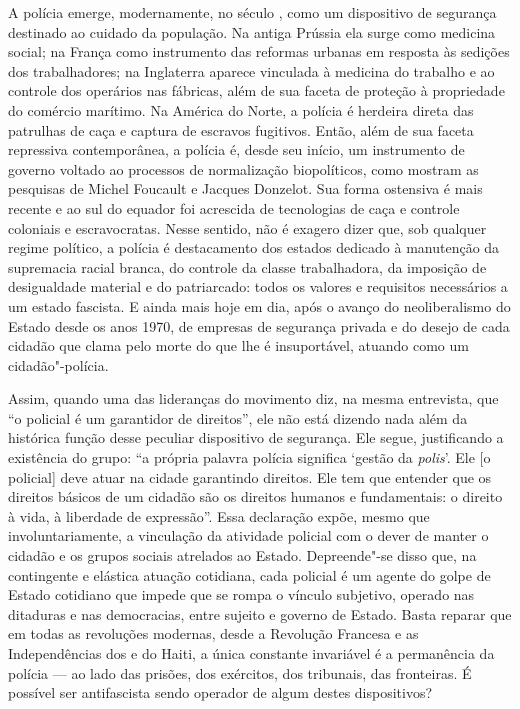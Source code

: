 A polícia emerge, modernamente, no século , como um dispositivo de segurança destinado ao cuidado da população. Na antiga Prússia ela surge como medicina social; na França como instrumento das reformas urbanas em resposta às sedições dos trabalhadores; na Inglaterra aparece vinculada à medicina do trabalho e ao controle dos operários nas fábricas, além de sua faceta de proteção à propriedade do comércio marítimo. Na América do Norte, a polícia é herdeira direta das patrulhas de caça e captura de escravos fugitivos. Então, além de sua faceta repressiva contemporânea, a polícia é, desde seu início, um instrumento de governo voltado ao processos de normalização biopolíticos, como mostram as pesquisas de Michel Foucault e Jacques Donzelot. Sua forma ostensiva é mais recente e ao sul do equador foi acrescida de tecnologias de caça e controle coloniais e escravocratas. Nesse sentido, não é exagero dizer que, sob qualquer regime político, a polícia é destacamento dos estados dedicado à manutenção da supremacia racial branca, do controle da classe trabalhadora, da imposição de desigualdade material e do patriarcado: todos os valores e requisitos necessários a um estado fascista. E ainda mais hoje em dia, após o avanço do neoliberalismo do Estado desde os anos 1970, de empresas de segurança privada e do desejo de cada cidadão que clama pelo morte do que lhe é insuportável, atuando como um cidadão"-polícia.

Assim, quando uma das lideranças do movimento diz, na mesma entrevista, que ``o policial é um garantidor de direitos'', ele não está dizendo nada além da histórica função desse peculiar dispositivo de segurança. Ele segue, justificando a existência do grupo: ``a própria palavra polícia significa `gestão da \emph{polis}'. Ele [o policial] deve atuar na cidade garantindo direitos. Ele tem que entender que os direitos básicos de um cidadão são os direitos humanos e fundamentais: o direito à vida, à liberdade de expressão''. Essa declaração expõe, mesmo que involuntariamente, a vinculação da atividade policial com o dever de manter o cidadão e os grupos sociais atrelados ao Estado. Depreende"-se disso que, na contingente e elástica atuação cotidiana, cada policial é um agente do golpe de Estado cotidiano que impede que se rompa o vínculo subjetivo, operado nas ditaduras e nas democracias, entre sujeito e governo de Estado. Basta reparar que em todas as revoluções modernas, desde a Revolução Francesa e as Independências dos  e do Haiti, a única constante invariável é a permanência da polícia --- ao lado das prisões, dos exércitos, dos tribunais, das fronteiras. É possível ser antifascista sendo operador de algum destes dispositivos?

